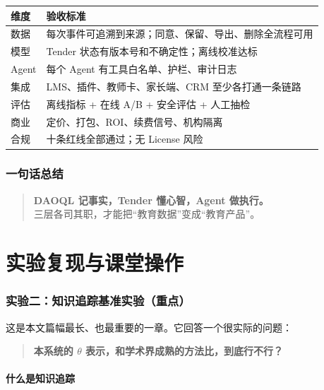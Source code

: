 \documentclass[UTF8,a4paper,11pt]{ctexart}
\begin{document}
\begin{center}
\begin{longtable}{@{}p{3.4cm}p{9.8cm}@{}}
\toprule
\textbf{维度} & \textbf{验收标准} \\
\midrule
数据 & 每次事件可追溯到来源；同意、保留、导出、删除全流程可用 \\
模型 & Tender 状态有版本号和不确定性；离线校准达标 \\
Agent & 每个 Agent 有工具白名单、护栏、审计日志 \\
集成 & LMS、插件、教师卡、家长端、CRM 至少各打通一条链路 \\
评估 & 离线指标 + 在线 A/B + 安全评估 + 人工抽检 \\
商业 & 定价、打包、ROI、续费信号、机构隔离 \\
合规 & 十条红线全部通过；无 License 风险 \\
\bottomrule
\end{longtable}
\end{center}

\section{一句话总结}

\begin{quote}
\large
\textbf{DAOQL 记事实，Tender 懂心智，Agent 做执行。}\\
三层各司其职，才能把“教育数据”变成“教育产品”。
\end{quote}

\part{实验复现与课堂操作}

\section{实验二：知识追踪基准实验（重点）}

这是本文篇幅最长、也最重要的一章。它回答一个很实际的问题：

\begin{quote}
\large \textbf{本系统的 $\theta$ 表示，和学术界成熟的方法比，到底行不行？}
\end{quote}

\subsection{什么是知识追踪}
\end{document}
